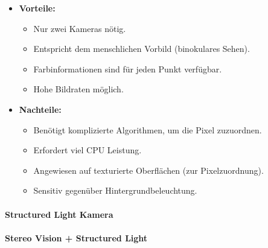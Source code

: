 \documentclass[a4paper, 11pt, accentcolor = tud3b]{tudreport}
\begin{document}
						\begin{itemize}
							\item \textbf{Vorteile:}
								\begin{itemize}
									\item Nur zwei Kameras nötig.
									\item Entspricht dem menschlichen Vorbild (binokulares Sehen).
									\item Farbinformationen sind für jeden Punkt verfügbar.
									\item Hohe Bildraten möglich.
								\end{itemize}
							\item \textbf{Nachteile:}
								\begin{itemize}
									\item Benötigt komplizierte Algorithmen, um die Pixel zuzuordnen.
									\item Erfordert viel CPU Leistung.
									\item Angewiesen auf texturierte Oberflächen (zur Pixelzuordnung).
									\item Sensitiv gegenüber Hintergrundbeleuchtung.
								\end{itemize}
						\end{itemize}

					\paragraph{Structured Light Kamera} %

					\paragraph{Stereo Vision + Structured Light} %
\end{document}
